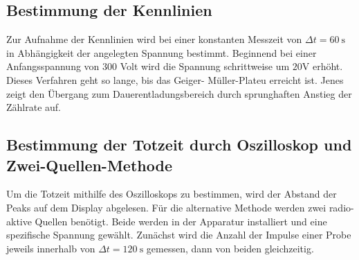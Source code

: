 \subsection{Bestimmung der Kennlinien}
Zur Aufnahme der Kennlinien wird bei einer konstanten Messzeit von $\Delta t 
= \qty{60}{\second}$ in Abhängigkeit der angelegten Spannung bestimmt. 
Beginnend  bei einer Anfangsspannung von 300 Volt wird die Spannung schrittweise 
um $20 \unit{\volt}$ erhöht. Dieses Verfahren geht so lange, bis das Geiger-
Müller-Plateu erreicht ist. Jenes zeigt den Übergang zum Dauerentladungsbereich 
durch sprunghaften Anstieg der Zählrate auf.

\subsection{Bestimmung der Totzeit durch Oszilloskop und Zwei-Quellen-Methode}
Um die Totzeit mithilfe des Oszilloskops zu bestimmen, wird der Abstand der 
Peaks auf dem Display abgelesen. 
Für die alternative Methode werden zwei radio-aktive Quellen benötigt. Beide 
werden in der Apparatur installiert und eine spezifische Spannung gewählt. 
Zunächst wird die Anzahl der Impulse einer Probe jeweils innerhalb von 
$\Delta t = \qty{120}{\second}$ gemessen, dann von beiden gleichzeitig.
